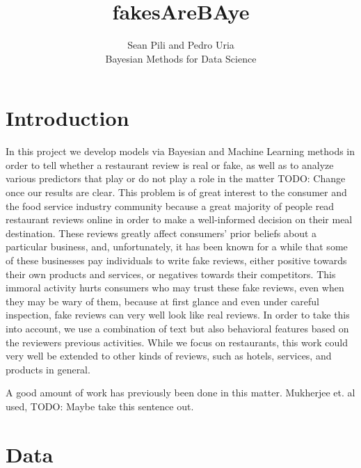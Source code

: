 \documentclass[man, floatsintext, 10pt]{apa6}
\title{fakesAreBAye}
\author{Sean Pili and Pedro Uria \\ Bayesian Methods for Data Science}
\affiliation{GWU}
\begin{document}
\maketitle

\section{Introduction}

In this project we develop models via Bayesian and Machine Learning methods in order to tell whether a restaurant review is real or fake, as well as to analyze various predictors that play or do not play a role in the matter TODO: Change once our results are clear. This problem is of great interest to the consumer and the food service industry community because a great majority of people read restaurant reviews online in order to make a well-informed decision on their meal destination. These reviews greatly affect consumers' prior beliefs about a particular business, and, unfortunately, it has been known for a while that some of these businesses pay individuals to write fake reviews, either positive towards their own products and services, or negatives towards their competitors. This immoral activity hurts consumers who may trust these fake reviews, even when they may be wary of them, because at first glance and even under careful inspection, fake reviews can very well look like real reviews. In order to take this into account, we use a combination of text but also behavioral features based on the reviewers previous activities.  While we focus on restaurants, this work could very well be extended to other kinds of reviews, such as hotels, services, and products in general.

A good amount of work has previously been done in this matter. Mukherjee et. al used, TODO: Maybe take this sentence out. 

\section{Data}
\end{document}
